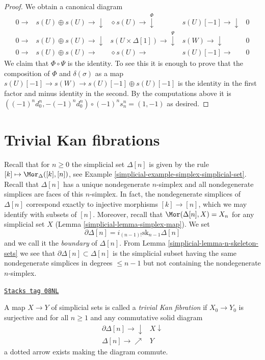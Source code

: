 \begin{proof}
\medskip\noindent
We obtain a canonical diagram
$$
\begin{array}{ccccc}0 \longrightarrow & s(U) \oplus s(U) \longrightarrow\downarrow & \diamond{s(U)} \longrightarrow\overset{\Phi}{\downarrow} & s(U)[-1] \longrightarrow\downarrow & 0 \\ 0 \longrightarrow & s(U) \oplus s(U) \longrightarrow\downarrow & s(U \times \Delta[1]) \longrightarrow\overset{\Psi}{\downarrow} & s(W) \longrightarrow\downarrow & 0 \\ 0 \longrightarrow & s(U) \oplus s(U) \longrightarrow & \diamond{s(U)} \longrightarrow & s(U)[-1] \longrightarrow & 0\end{array}
$$
We claim that $\Phi \circ \Psi$ is the identity.
To see this it is enough to prove that the composition
of $\Phi$ and $\delta(\sigma)$ as a map
$s(U)[-1] \to s(W) \to s(U)[-1] \oplus s(U)[-1]$ is the
identity in the first factor and minus identity in the second.
By the computations above it is
$((-1)^nd^n_0, -(-1)^nd^n_0) \circ (-1)^n s^n_n = (1, -1)$
as desired.
\end{proof}

\section{Trivial Kan fibrations}
\label{simplicial-section-trivial-kan}
Recall that for $n \geq 0$ the simplicial set $\Delta[n]$ is given
by the rule $[k] \mapsto \Mor_\Delta([k], [n])$, see
Example \ref{simplicial-example-simplex-simplicial-set}. Recall that $\Delta[n]$
has a unique nondegenerate $n$-simplex and all nondegenerate simplices
are faces of this $n$-simplex. In fact, the nondegenerate simplices of
$\Delta[n]$ correspond exactly to injective morphisms $[k] \to [n]$,
which we may identify with subsets of $[n]$. Moreover, recall that
$\Mor(\Delta[n], X) = X_n$ for any simplicial set $X$
(Lemma \ref{simplicial-lemma-simplex-map}).
We set
$$
\partial \Delta[n] = i_{(n - 1)!}\text{sk}_{n - 1}\Delta[n]
$$
and we call it the {\it boundary} of $\Delta[n]$.
From Lemma \ref{simplicial-lemma-n-skeleton-sets} we see that
$\partial \Delta[n] \subset \Delta[n]$
is the simplicial subset having the same nondegenerate simplices
in degrees $\leq n - 1$ but not containing the nondegenerate $n$-simplex.

\begin{definition}
\label{simplicial-definition-trivial-kan}
\href{https://stacks.math.columbia.edu/tag/08NL}{\texttt{Stacks tag 08NL}}

A map $X \to Y$ of simplicial sets is called a {\it trivial Kan fibration}
if $X_0 \to Y_0$ is surjective and for all $n \geq 1$ and any commutative
solid diagram
$$
\begin{array}{cc}\partial \Delta[n] \longrightarrow\downarrow & X \downarrow \\ \Delta[n] \longrightarrow\nearrow & Y\end{array}
$$
a dotted arrow exists making the diagram commute.
\end{definition}

